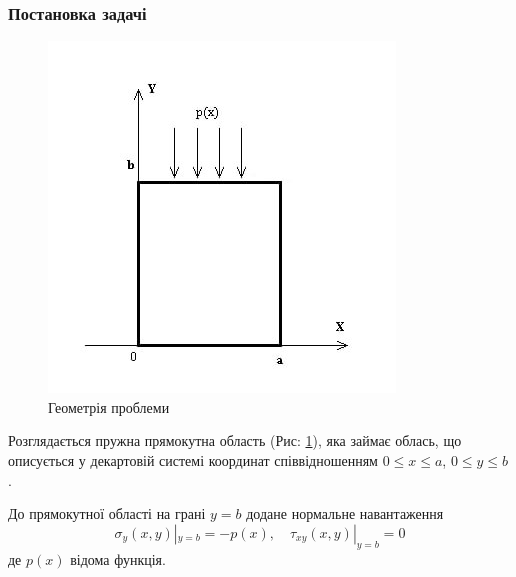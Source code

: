 \subsubsection{Постановка задачі}
\begin{figure}[h]
    \begin{center}
        \includegraphics[scale=1]{images/geometry/image_3.jpg}
    \end{center}
    \caption{Геометрія проблеми}\label{geom_static_1}
\end{figure}
Розглядається пружна прямокутна область (Рис: \ref{geom_static_1}), яка займає облась,
що описується у декартовій системі координат співвідношенням $0 \le x \le a$, $0 \le y \le b$.

До прямокутної області на грані $y=b$ додане нормальне навантаження
\begin{equation}
    \sigma_y(x, y) |_{y=b} = -p(x), \quad  \tau_{xy}(x,y) |_{y=b} =0
\end{equation}
де $p(x)$ відома функція.

